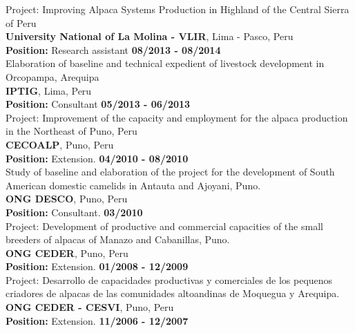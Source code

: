 \documentclass[margin,line,10pt]{res}
\begin{document}
\begin{resume}
Project: Improving Alpaca Systems Production in Highland of the Central Sierra of Peru\\
{\bf University National of La Molina - VLIR}, Lima - Pasco, Peru\\
\vspace{-.3cm}
\textbf{Position:} Research assistant \hfill {\bf 08/2013 - 08/2014}\\

Elaboration of baseline and technical expedient of livestock development in Orcopampa, Arequipa\\
{\bf IPTIG}, Lima, Peru\\
\vspace{-.3cm}
\textbf{Position:} Consultant  \hfill {\bf 05/2013 - 06/2013}\\

Project: Improvement of the capacity and employment for the alpaca production in the Northeast of Puno, Peru\\
{\bf CECOALP}, Puno, Peru\\
\vspace{-.3cm}
\textbf{Position:} Extension.  \hfill {\bf 04/2010 - 08/2010}\\

Study of baseline and elaboration of the project for the development of South American domestic camelids in Antauta and Ajoyani, Puno.\\
{\bf ONG DESCO}, Puno, Peru\\
\vspace{-.3cm}
\textbf{Position:} Consultant.  \hfill {\bf 03/2010}\\

Project: Development of productive and commercial capacities of the small breeders of alpacas of Manazo and Cabanillas, Puno.\\
{\bf ONG CEDER}, Puno, Peru\\
\vspace{-.3cm}
\textbf{Position:} Extension.  \hfill {\bf 01/2008 - 12/2009}\\

Project: Desarrollo de capacidades productivas y comerciales de los pequenos criadores de alpacas de las comunidades altoandinas de Moquegua y Arequipa.\\
{\bf ONG CEDER - CESVI}, Puno, Peru\\
\vspace{-.3cm}
\textbf{Position:} Extension.  \hfill {\bf 11/2006 - 12/2007}\\


\end{resume}
\end{document}

